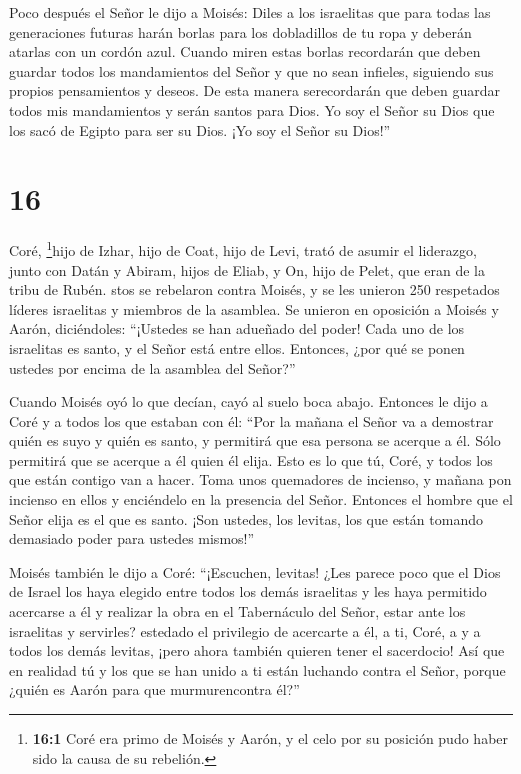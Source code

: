  Poco después el Señor le dijo a Moisés: 
Diles a los israelitas que para todas las generaciones futuras harán
borlas para los dobladillos de tu ropa y deberán atarlas con un cordón
azul.  Cuando miren estas borlas recordarán que deben
guardar todos los mandamientos del Señor y que no sean infieles,
siguiendo sus propios pensamientos y deseos.  De esta
manera serecordarán que deben guardar todos mis mandamientos y serán
santos para Dios. Yo soy el Señor su Dios que los sacó de Egipto para
ser su Dios.  ¡Yo soy el Señor su Dios!''

\hypertarget{section-15}{%
\section{16}\label{section-15}}

 Coré, \footnote{\textbf{16:1} Coré era primo de Moisés y
  Aarón, y el celo por su posición pudo haber sido la causa de su
  rebelión.}hijo de Izhar, hijo de Coat, hijo de Levi, trató de asumir
el liderazgo, junto con Datán y Abiram, hijos de Eliab, y On, hijo de
Pelet, que eran de la tribu de Rubén.  stos se rebelaron
contra Moisés, y se les unieron 250 respetados líderes israelitas y
miembros de la asamblea.  Se unieron en oposición a Moisés y
Aarón, diciéndoles: ``¡Ustedes se han adueñado del poder! Cada uno de
los israelitas es santo, y el Señor está entre ellos. Entonces, ¿por qué
se ponen ustedes por encima de la asamblea del Señor?''

 Cuando Moisés oyó lo que decían, cayó al suelo boca abajo.
 Entonces le dijo a Coré y a todos los que estaban con él:
``Por la mañana el Señor va a demostrar quién es suyo y quién es santo,
y permitirá que esa persona se acerque a él. Sólo permitirá que se
acerque a él quien él elija.  Esto es lo que tú, Coré, y
todos los que están contigo van a hacer. Toma unos quemadores de
incienso,  y mañana pon incienso en ellos y enciéndelo en la
presencia del Señor. Entonces el hombre que el Señor elija es el que es
santo. ¡Son ustedes, los levitas, los que están tomando demasiado poder
para ustedes mismos!''

 Moisés también le dijo a Coré: ``¡Escuchen, levitas!
 ¿Les parece poco que el Dios de Israel los haya elegido
entre todos los demás israelitas y les haya permitido acercarse a él y
realizar la obra en el Tabernáculo del Señor, estar ante los israelitas
y servirles?  estedado el privilegio de acercarte a él, a
ti, Coré, a y a todos los demás levitas, ¡pero ahora también quieren
tener el sacerdocio!  Así que en realidad tú y los que se
han unido a ti están luchando contra el Señor, porque ¿quién es Aarón
para que murmurencontra él?''

